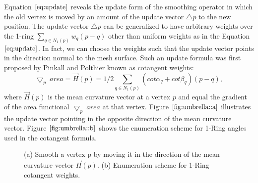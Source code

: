 \documentclass[11pt]{article}
\begin{document}
Equation $\ref{eq:update}$ reveals the update form of the smoothing operator in which the old vertex is moved by an amount of the update vector $\bigtriangleup p$ to the new position. The update vector $\bigtriangleup p$ can be generalized to have arbitrary weights over the 1-ring $\sum\limits_{q \in N_1(p)}w_q(p - q)$ other than uniform weights as in the Equation $\ref{eq:update}$. In fact, we can choose the weights such that the update vector points in the direction normal to the mesh surface. Such an update formula was first proposed by Pinkall and Polthier \cite{Pinkall93computingdiscrete} known as cotangent weights:
\begin{equation}
\bigtriangledown_p\ area = \vec{H}(p) = 1/2\sum\limits_{q \in N_1(p)}{(cot\alpha_{q} + cot\beta_{q})(p-q)},
\label{eq:cotangent}
\end{equation}
where $\vec{H}(p)$ is the mean curvature vector at a vertex $p$ and equal the gradient of the area functional $\bigtriangledown_p\ area$ at that vertex. Figure $\ref{fig:umbrella::a}$ illustrates the update vector pointing in the opposite direction  of the mean curvature vector. Figure $\ref{fig:umbrella::b}$ shows the enumeration scheme for 1-Ring angles used in the cotangent formula.

\begin{figure}[htbp]
    \centering
    \caption{(a) Smooth a vertex p by moving it in the direction of the mean curvature vector $\vec{H}(p)$. (b) Enumeration scheme for 1-Ring cotangent weights.}
    \label{fig:umbrella}
\end{figure}
\end{document}
